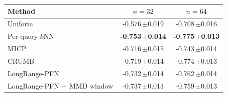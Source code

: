 \begin{tabular}{lcc}
\toprule
Method & $n=32$ & $n=64$\\
\midrule
Uniform & -0.576\,{\scriptsize$\pm$0.019} & -0.708\,{\scriptsize$\pm$0.016}\\
Per-query $k$NN & \textbf{-0.753\,{\scriptsize$\pm$0.014}} & \textbf{-0.775\,{\scriptsize$\pm$0.013}}\\
MICP & -0.716\,{\scriptsize$\pm$0.015} & -0.743\,{\scriptsize$\pm$0.014}\\
CRUMB & -0.719\,{\scriptsize$\pm$0.014} & -0.774\,{\scriptsize$\pm$0.013}\\
LongRange-PFN & -0.732\,{\scriptsize$\pm$0.014} & -0.762\,{\scriptsize$\pm$0.014}\\
LongRange-PFN + MMD window & -0.737\,{\scriptsize$\pm$0.013} & -0.759\,{\scriptsize$\pm$0.013}\\
\bottomrule
\end{tabular}
